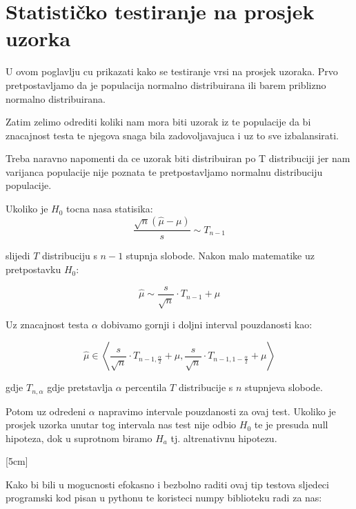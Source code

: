 \chapter{Statističko testiranje na prosjek uzorka}

U ovom poglavlju cu prikazati kako se testiranje vrsi na prosjek uzoraka. Prvo pretpostavljamo da je populacija normalno distribuirana ili barem priblizno normalno distribuirana.

Zatim zelimo odrediti koliki nam mora biti uzorak iz te populacije da bi znacajnost testa te njegova snaga bila zadovoljavajuca i uz to sve izbalansirati. 


Treba naravno napomenti da ce uzorak biti distribuiran po T distribuciji jer nam varijanca populacije nije poznata te pretpostavljamo normalnu distribuciju populacije.

Ukoliko je $H_0$ tocna nasa statisika: \[\frac{\sqrt{n} (\hat{\mu} - \mu)}{s} \sim T_{n-1}\]

slijedi $T$ distribuciju s $n-1$ stupnja slobode. Nakon malo matematike uz pretpostavku $H_0$:

\[
\hat{\mu} \sim \frac{s}{\sqrt{n}} \cdot T_{n-1} + \mu
\]

Uz znacajnost testa $\alpha$ dobivamo gornji i doljni interval pouzdanosti kao:

\[
\hat{\mu} \in \left< \frac{s}{\sqrt{n}} \cdot T_{n-1, \frac{\alpha}{2}} + \mu, \frac{s}{\sqrt{n}} \cdot T_{n-1, 1 - \frac{\alpha}{2}} + \mu \right>
\]

gdje $T_{n, \alpha}$ gdje pretstavlja $\alpha$ percentila $T$ distribucije s $n$ stupnjeva slobode.

Potom uz odredeni $\alpha$ napravimo intervale pouzdanosti za ovaj test. Ukoliko je prosjek uzorka unutar tog intervala nas test nije odbio $H_0$ te je presuda null hipoteza, dok u suprotnom biramo $H_a$ tj. altrenativnu hipotezu.


[5cm]

Kako bi bili u mogucnosti efokasno i bezbolno raditi ovaj tip testova sljedeci programski kod pisan u pythonu te koristeci numpy biblioteku radi za nas:


